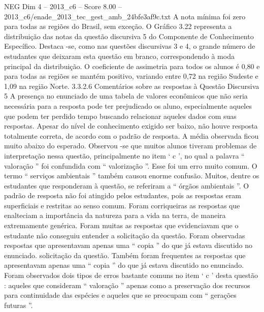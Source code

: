 \begin{textsample}{NEG Dim 4 – 2013\_c6 – Score 8.00 – 2013\_c6/enade\_2013\_tec\_gest\_amb\_24bfe3af9c.txt}
A nota mínima foi zero para todas as regiões do Brasil, sem exceção.
O Gráfico 3.22 representa a distribuição das notas da questão discursiva 5 do Componente de Conhecimento Específico.
Destaca -se, como nas questões discursivas 3 e 4, o grande número de estudantes que deixaram esta questão em branco, correspondendo à moda principal da distribuição.
O coeficiente de assimetria para todos os alunos é 0,80 e para todas as regiões se mantém positivo, variando entre 0,72 na região Sudeste e 1,09 na região Norte. 3.3.2.6 Comentários sobre as respostas à Questão Discursiva 5 A presença no enunciado de uma tabela de valores econômicos que não seria necessária para a resposta pode ter prejudicado os aluno, especialmente aqueles que podem ter perdido tempo buscando relacionar aqueles dados com suas respostas.
Apesar do nível de conhecimento exigido ser baixo, não houve resposta totalmente correta, de acordo com o padrão de resposta.
A média observada ficou muito abaixo do esperado.
Observou -se que muitos alunos tiveram problemas de interpretação nessa questão, principalmente no item ‘ c ’, no qual a palavra “ valoração ” foi confundida com “ valorização ”.
Esse foi um erro muito comum.
O termo “ serviços ambientais ” também causou enorme confusão.
Muitos, dentre os estudantes que responderam à questão, se referiram a “ órgãos ambientais ”.
O padrão de resposta não foi atingido pelos estudantes, pois as respostas eram superficiais e restritas ao senso comum.
Foram corriqueiras as respostas que enalteciam a importância da natureza para a vida na terra, de maneira extremamente genérica.
Foram muitas as respostas que evidenciavam que o estudante não conseguiu entender a solicitação da questão.
Foram observadas respostas que apresentavam apenas uma “ copia ” do que já estava discutido no enunciado. solicitação da questão.
Também foram frequentes as respostas que apresentavam apenas uma “ copia ” do que já estava discutido no enunciado.
Foram observados dois tipos de erros bastante comuns no item ‘ c ’ desta questão : aqueles que consideram “ valoração ” apenas como a preservação dos recursos para continuidade das espécies e aqueles que se preocupam com “ gerações futuras ”.

\end{textsample}
